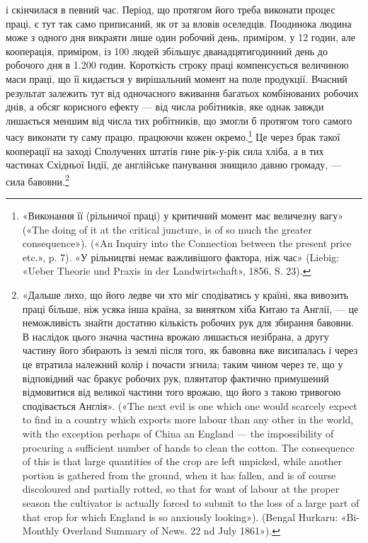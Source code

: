 і скінчилася в певний час. Період, що протягом його треба виконати
процес праці, є тут так само приписаний, як от за вловів
оселедців. Поодинока людина може з одного дня викраяти лише
один робочий день, приміром, у 12 годин, але кооперація, приміром,
із 100 людей збільшує дванадцятигодинний день до робочого
дня в 1.200 годин. Короткість строку праці компенсується
величиною маси праці, що її кидається у вирішальний момент
на поле продукції. Вчасний результат залежить тут від одночасного
вживання багатьох комбінованих робочих днів, а обсяг
корисного ефекту — від числа робітників, яке однак завжди
лишається меншим від числа тих робітників, що змогли б протягом
того самого часу виконати ту саму працю, працюючи кожен
окремо.\footnote{
«Виконання її (рільничої праці) у критичний момент має величезну
вагу» («The doing of it at the critical juncture, is of so much the
greater consequence»). («An Inquiry into the Connection between the present
price etc.», p. 7). «У рільництві немає важливішого фактора, ніж час»
(Liebig: «Ueber Theorie und Praxis in der Landwirtschaft», 1856, S. 23).
} Це через брак такої кооперації на заході Сполучених
штатів гине рік-у-рік сила хліба, а в тих частинах Східньої
Індії, де англійське панування знищило давню громаду, — сила
бавовни.\footnote{
«Дальше лихо, що його ледве чи хто міг сподіватись у країні,
яка вивозить праці більше, ніж усяка інша країна, за винятком хіба
Китаю та Англії, — це неможливість знайти достатню кількість робочих
рук для збирання бавовни. В наслідок цього значна частина врожаю лишається
незібрана, а другу частину його збирають із землі після того, як
бавовна вже висипалась і через це втратила належний колір і почасти
згнила; таким чином через те, що у відповідний час бракує робочих рук,
плянтатор фактично примушений відмовитися від великої частини того
врожаю, що його з такою тривогою сподівається Англія». («The next
evil is one which one would scarcely expect to find in a country which exports
more labour than any other in the world, with the exception perhaps of
China an England — the impossibility of procuring a sufficient number of
hands to clean the cotton. The consequence of this is that large quantities of
the crop are left unpicked, while another portion is gathered from the ground,
when it has fallen, and is of course discoloured and partially rotted, so
that for want of labour at the proper season the cultivator is actually forced
to submit to the loss of a large part of that crop for which England is so
anxiously looking»). (Bengal Hurkaru: «Bi-Monthly Overland Summary
of News. 22 nd July 1861»).
}


